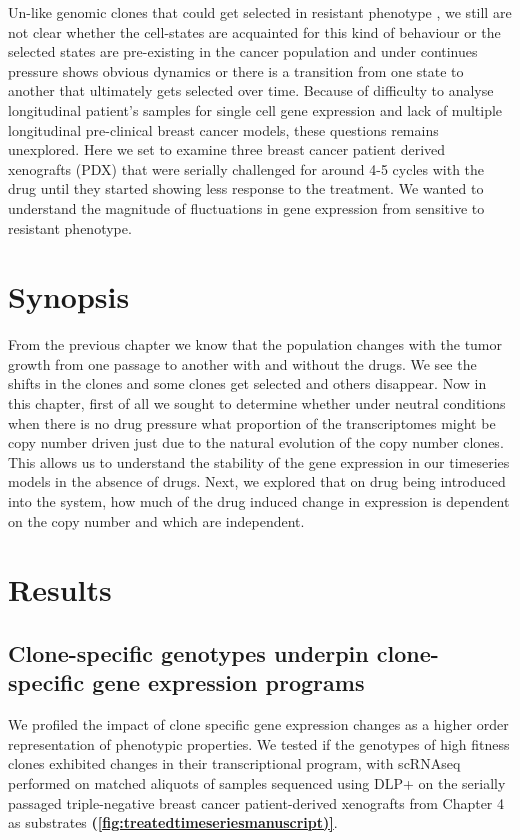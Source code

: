 Un-like genomic clones that could get selected in resistant phenotype \cite{salehi2020single}, we still are not clear whether the cell-states are acquainted for this kind of behaviour or the selected states are pre-existing in the cancer population and under continues pressure shows obvious dynamics or there is a transition from one state to another that ultimately gets selected over time. Because of difficulty to analyse longitudinal patient's samples for single cell gene expression and lack of multiple longitudinal pre-clinical breast cancer models, these questions remains unexplored. Here we set to examine three breast cancer patient derived xenografts (PDX) that were serially challenged for around 4-5 cycles with the drug until they started showing less response to the treatment. We wanted to understand the magnitude of fluctuations in gene expression from sensitive to resistant phenotype.


 \section{Synopsis}
   From the previous chapter we know that the population changes with the tumor growth from one passage to another with and without the drugs. We see the shifts in the clones and some clones get selected and others disappear.
   Now in this chapter, first of all we sought to determine whether under neutral conditions when there is no drug pressure what proportion of the transcriptomes might be copy number driven just due to the natural evolution of the copy number clones. This allows us to understand the stability of the gene expression in our timeseries models in the absence of drugs.
   Next, we explored that on drug being introduced into the system, how much of the drug induced change in expression is dependent on the copy number and which are independent.




\section{Results}


\subsection{Clone-specific genotypes underpin clone-specific gene expression programs}
We profiled the impact of clone specific gene expression changes as a higher order representation of phenotypic properties. We tested if the genotypes of high fitness clones exhibited changes in their transcriptional program, with scRNAseq performed on matched aliquots of samples sequenced using DLP+ on the serially passaged triple-negative breast cancer patient-derived xenografts from Chapter 4 as substrates \textbf{(\autoref{fig:treatedtimeseriesmanuscript)}}.

